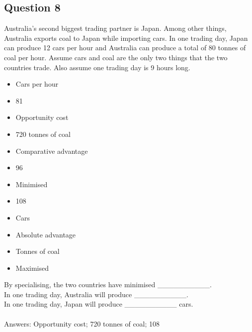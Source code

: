 \subsection{Question 8}
Australia's second biggest trading partner is Japan. Among other things, Australia exports coal to Japan while importing cars. In one trading day, Japan can produce 12 cars per hour and Australia can produce a total of 80 tonnes of coal per hour. Assume cars and coal are the only two things that the two countries trade. Also assume one trading day is 9 hours long.
\begin{multicols}{3}
	\begin{itemize}
		\item Cars per hour
		\item 81
		\item Opportunity cost
		\item 720 tonnes of coal
		\item Comparative advantage
		\item 96
		\item Minimised
		\item 108
		\item Cars
		\item Absolute advantage
		\item Tonnes of coal
		\item Maximised
	\end{itemize}
\end{multicols}
By specialising, the two countries have minimised \_\_\_\_\_\_\_\_\_\_.\\
In one trading day, Australia will produce \_\_\_\_\_\_\_\_\_\_.\\
In one trading day, Japan will produce \_\_\_\_\_\_\_\_\_\_ cars.\\\\
Answers: Opportunity cost; 720 tonnes of coal; 108

